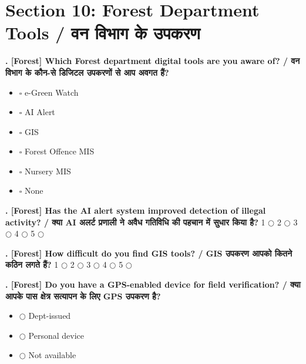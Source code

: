 \documentclass[11pt,a4paper]{article}
\newcounter{qcounter}
\begin{document}
\section*{Section 10: Forest Department Tools / वन विभाग के उपकरण}
\vspace{0.2cm}
\textbf{. [Forest] Which Forest department digital tools are you aware of? / वन विभाग के कौन-से डिजिटल उपकरणों से आप अवगत हैं?}
\vspace{0.1cm}
\begin{itemize}[label=, itemsep=0.1cm, leftmargin=0.5cm]
    \item $\square$ e-Green Watch
    \item $\square$ AI Alert
    \item $\square$ GIS
    \item $\square$ Forest Offence MIS
    \item $\square$ Nursery MIS
    \item $\square$ None
\end{itemize}
\vspace{0.2cm}

\textbf{. [Forest] Has the AI alert system improved detection of illegal activity? / क्या AI अलर्ट प्रणाली ने अवैध गतिविधि की पहचान में सुधार किया है?}
\vspace{0.1cm}
\vspace{0.1cm}
1 $\bigcirc$ \hspace{1cm} 2 $\bigcirc$ \hspace{1cm} 3 $\bigcirc$ \hspace{1cm} 4 $\bigcirc$ \hspace{1cm} 5 $\bigcirc$
\vspace{0.4cm}

\textbf{. [Forest] How difficult do you find GIS tools? / GIS उपकरण आपको कितने कठिन लगते हैं?}
\vspace{0.1cm}
\vspace{0.1cm}
1 $\bigcirc$ \hspace{1cm} 2 $\bigcirc$ \hspace{1cm} 3 $\bigcirc$ \hspace{1cm} 4 $\bigcirc$ \hspace{1cm} 5 $\bigcirc$
\vspace{0.4cm}

\textbf{. [Forest] Do you have a GPS-enabled device for field verification? / क्या आपके पास क्षेत्र सत्यापन के लिए GPS उपकरण है?}
\vspace{0.1cm}
\begin{itemize}[label=, itemsep=0.1cm, leftmargin=0.5cm]
    \item $\bigcirc$ Dept-issued
    \item $\bigcirc$ Personal device
    \item $\bigcirc$ Not available
\end{itemize}
\vspace{0.2cm}
\end{document}

